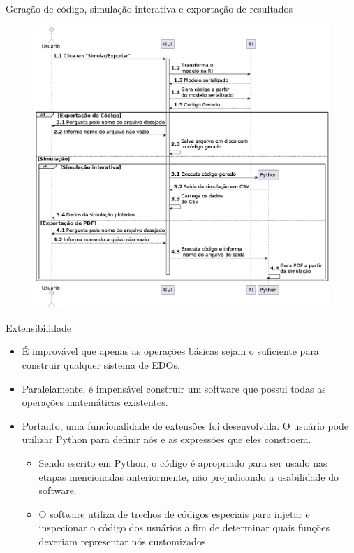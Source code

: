 \begin{frame}{Geração de código, simulação interativa e exportação de resultados}
    \begin{figure}
        \centering
        \includegraphics[height=\textheight]{contents/imgs/gui-ri.png}
    \end{figure}
\end{frame}

\begin{frame}[fragile]{Extensibilidade}
    \begin{itemize}
        \item É improvável que apenas as operações básicas sejam o suficiente para construir qualquer sistema de EDOs.
        \item Paralelamente, é impensável construir um software que possui todas as operações matemáticas existentes.
        \item Portanto, uma funcionalidade de extensões foi desenvolvida. O usuário pode utilizar Python para definir nós e as expressões que eles constroem.
        \begin{itemize}
            \item Sendo escrito em Python, o código é apropriado para ser usado nas etapas mencionadas anteriormente, não prejudicando a usabilidade do software.
            \item O software utiliza de trechos de códigos especiais para injetar e inspecionar o código dos usuários a fim de determinar quais funções deveriam representar nós customizados.
        \end{itemize}
    \end{itemize}
\end{frame}

